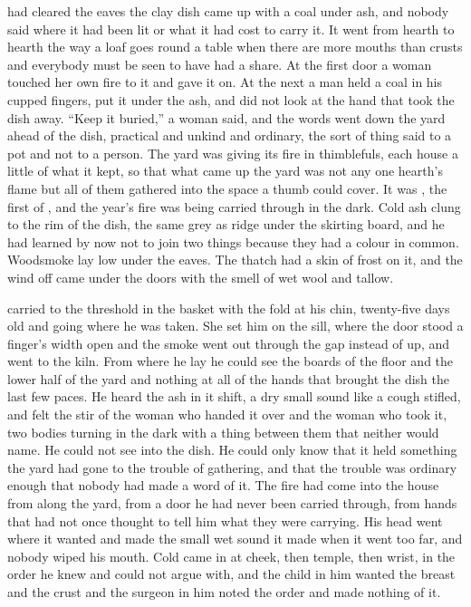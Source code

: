 
 had cleared the eaves the clay dish came up  with a coal under ash, and nobody said where it had been lit or what it had cost to carry it. It went from hearth to hearth the way a loaf goes round a table when there are more mouths than crusts and everybody must be seen to have had a share. At the first door a woman touched her own fire to it and gave it on. At the next a man held a coal in his cupped fingers, put it under the ash, and did not look at the hand that took the dish away. “Keep it buried,” a woman said, and the words went down the yard ahead of the dish, practical and unkind and ordinary, the sort of thing said to a pot and not to a person. The yard was giving its fire in thimblefuls, each house a little of what it kept, so that what came up the yard was not any one hearth's flame but all of them gathered into the space a thumb could cover. It was , the first of , and the year's fire was being carried through  in the dark. Cold ash clung to the rim of the dish, the same grey as  ridge under the skirting board, and he had learned by now not to join two things because they had a colour in common. Woodsmoke lay low under the eaves. The thatch had a skin of frost on it, and the wind off  came under the doors with the smell of wet wool and tallow.

 carried  to the threshold in the basket with the fold at his chin, twenty-five days old and going where he was taken. She set him on the sill, where the door stood a finger's width open and the smoke went out through the gap instead of up, and went to the kiln. From where he lay he could see the boards of the floor and the lower half of the yard and nothing at all of the hands that brought the dish the last few paces. He heard the ash in it shift, a dry small sound like a cough stifled, and felt the stir of the woman who handed it over and the woman who took it, two bodies turning in the dark with a thing between them that neither would name. He could not see into the dish. He could only know that it held something the yard had gone to the trouble of gathering, and that the trouble was ordinary enough that nobody had made a word of it. The fire had come into the house from along the yard, from a door he had never been carried through, from hands that had not once thought to tell him what they were carrying. His head went where it wanted and made the small wet sound it made when it went too far, and nobody wiped his mouth. Cold came in at cheek, then temple, then wrist, in the order he knew and could not argue with, and the child in him wanted the breast and the crust and the surgeon in him noted the order and made nothing of it.

